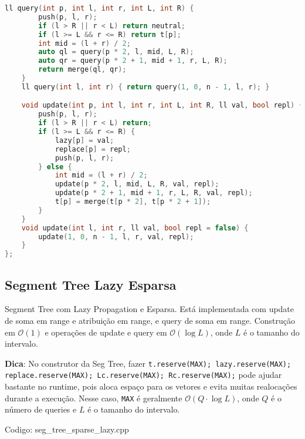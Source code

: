 \documentclass[10pt, a4paper, oneside]{book}
\begin{document}
\begin{lstlisting}[language=C++]
    ll query(int p, int l, int r, int L, int R) {
        push(p, l, r);
        if (l > R || r < L) return neutral;
        if (l >= L && r <= R) return t[p];
        int mid = (l + r) / 2;
        auto ql = query(p * 2, l, mid, L, R);
        auto qr = query(p * 2 + 1, mid + 1, r, L, R);
        return merge(ql, qr);
    }
    ll query(int l, int r) { return query(1, 0, n - 1, l, r); }

    void update(int p, int l, int r, int L, int R, ll val, bool repl) {
        push(p, l, r);
        if (l > R || r < L) return;
        if (l >= L && r <= R) {
            lazy[p] = val;
            replace[p] = repl;
            push(p, l, r);
        } else {
            int mid = (l + r) / 2;
            update(p * 2, l, mid, L, R, val, repl);
            update(p * 2 + 1, mid + 1, r, L, R, val, repl);
            t[p] = merge(t[p * 2], t[p * 2 + 1]);
        }
    }
    void update(int l, int r, ll val, bool repl = false) {
        update(1, 0, n - 1, l, r, val, repl);
    }
};\end{lstlisting}
\hfill

\subsection{Segment Tree Lazy Esparsa}


Segment Tree com Lazy Propagation e Esparsa. Está implementada com update de soma em range e atribuição em range, e query de soma em range. Construção em $\mathcal{O}(1)$ e operações de update e query em $\mathcal{O}(\log L)$, onde $L$ é o tamanho do intervalo.



\textbf{Dica}: No construtor da Seg Tree, fazer \texttt{t.reserve(MAX); lazy.reserve(MAX); replace.reserve(MAX); Lc.reserve(MAX); Rc.reserve(MAX);} pode ajudar bastante no runtime, pois aloca espaço para os vetores e evita muitas realocações durante a execução. Nesse caso, \texttt{MAX} é geralmente $\mathcal{O}(Q \cdot \log L)$, onde $Q$ é o número de queries e $L$ é o tamanho do intervalo.
\hfill

Codigo: seg\_tree\_sparse\_lazy.cpp
\end{document}
